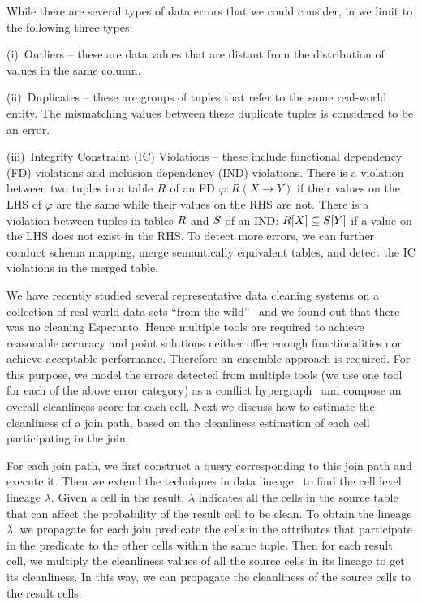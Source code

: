 While there are several types of data errors that we could consider, in \dcv we limit to the following three types:

\stab
(i)~Outliers -- these are data values that are distant from the distribution of values in the same column. 

\stab
(ii)~Duplicates -- these are groups of tuples that refer to the same real-world entity. The mismatching values between these duplicate tuples is considered to be an error.

\stab
(iii)~Integrity Constraint (IC) Violations -- these include functional dependency (FD) violations and inclusion dependency (IND) violations. There is a violation between two tuples in a table $\R$ of an FD $\varphi: R(X\rightarrow Y)$ if their values on the LHS of $\varphi$ are the same while their values on the RHS are not. There is a violation between tuples in tables $\R$ and $\S$ of an IND: $\R[X]\subseteq\S[Y]$ if a value on the LHS does not exist in the RHS. To detect more errors, we can further conduct schema mapping, merge semantically equivalent tables, and detect the IC violations in the merged table.

\stab
We have recently studied several representative data cleaning systems on a collection of real world data sets ``from the wild''~\cite{DBLP:journals/pvldb/AbedjanCDFIOPST16} and we found out that there was no cleaning Esperanto. Hence multiple tools are required to achieve reasonable accuracy and point solutions neither offer enough functionalities nor achieve acceptable performance. Therefore an ensemble approach is required. For this purpose, we model the errors detected from multiple tools (we use one tool for each of the above error category) as a conflict hypergraph~\cite{DBLP:conf/icde/ChuIP13} and compose an overall cleanliness score for each cell. Next we discuss how to estimate the cleanliness of a join path, based on the cleanliness estimation of each cell participating in the join.

For each join path, we first construct a query corresponding to this join path and execute it. 
Then we extend the techniques in data lineage~\cite{DBLP:conf/cidr/Widom05} to find the cell level lineage $\lambda$. 
Given a cell in the result, $\lambda$ indicates all the cells in the source table that can affect the probability of the result cell to be clean. 
To obtain the lineage $\lambda$, 
we propagate for each join predicate the cells in the attributes that participate in the predicate to the other cells within the same tuple. 
Then for each result cell, we multiply the cleanliness values of all the source cells in its lineage to get its cleanliness. In this way, we can propagate the cleanliness of the source cells to the result cells.

